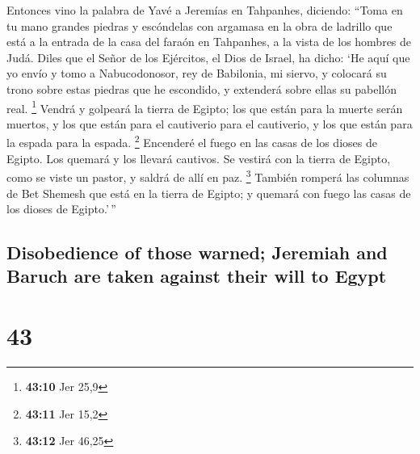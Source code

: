 \begin{paracol}{2}
 Entonces vino la palabra de Yavé a Jeremías en Tahpanhes,
diciendo:  ``Toma en tu mano grandes piedras y escóndelas
con argamasa en la obra de ladrillo que está a la entrada de la casa del
faraón en Tahpanhes, a la vista de los hombres de Judá. 
Diles que el Señor de los Ejércitos, el Dios de Israel, ha dicho: `He
aquí que yo envío y tomo a Nabucodonosor, rey de Babilonia, mi siervo, y
colocará su trono sobre estas piedras que he escondido, y extenderá
sobre ellas su pabellón real. \footnote{\textbf{43:10} Jer 25,9}
 Vendrá y golpeará la tierra de Egipto; los que están
para la muerte serán muertos, y los que están para el cautiverio para el
cautiverio, y los que están para la espada para la espada. \footnote{\textbf{43:11}
  Jer 15,2}  Encenderé el fuego en las casas de los
dioses de Egipto. Los quemará y los llevará cautivos. Se vestirá con la
tierra de Egipto, como se viste un pastor, y saldrá de allí en paz.
\footnote{\textbf{43:12} Jer 46,25}  También romperá las
columnas de Bet Shemesh que está en la tierra de Egipto; y quemará con
fuego las casas de los dioses de Egipto.'\,''

\switchcolumn
\begin{otherlanguage}{english}

\hypertarget{disobedience-of-those-warned-jeremiah-and-baruch-are-taken-against-their-will-to-egypt}{%
\subsection{Disobedience of those warned; Jeremiah and Baruch are taken
against their will to
Egypt}\label{disobedience-of-those-warned-jeremiah-and-baruch-are-taken-against-their-will-to-egypt}}

\hypertarget{section-85}{%
\section{43}\label{section-85}}


\end{otherlanguage}
\end{paracol}

